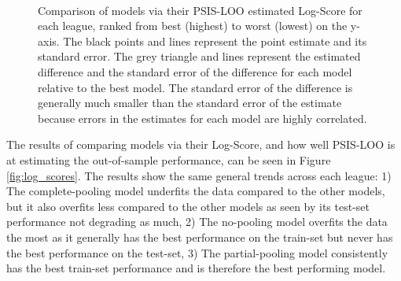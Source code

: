 \begin{figure}
	 \\
	\caption{Comparison of models via their PSIS-LOO estimated Log-Score for each league, ranked from best (highest) to worst (lowest) on the y-axis. The black points and lines represent the point estimate and its standard error. The grey triangle and lines represent the estimated difference and the standard error of the difference for each model relative to the best model. The standard error of the difference is generally much smaller than the standard error of the estimate because errors in the estimates for each model are highly correlated.}
	\label{fig:psis_loo}
\end{figure}

The results of comparing models via their Log-Score, and how well PSIS-LOO is at estimating the out-of-sample performance, can be seen in Figure \ref{fig:log_scores}. The results show the same general trends across each league: 1) The complete-pooling model underfits the data compared to the other models, but it also overfits less compared to the other models as seen by its test-set performance not degrading as much, 2) The no-pooling model overfits the data the most as it generally has the best performance on the train-set but never has the best performance on the test-set, 3) The partial-pooling model consistently has the best train-set performance and is therefore the best performing model.


